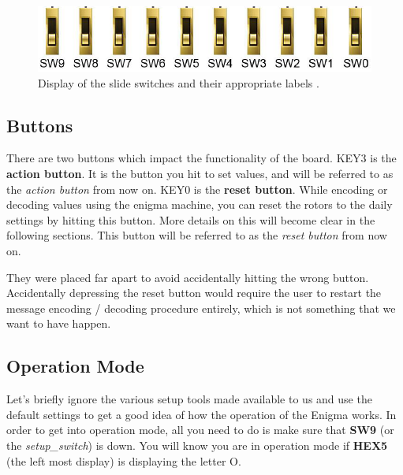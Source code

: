 \documentclass{article}
\begin{document}
\begin{figure}[ht!]
    \centering
    \includegraphics{slide_switch_shorthand.PNG}
    \caption{Display of the slide switches and their appropriate labels \cite{soc_manual}.}
    \label{fig:slide_switch_shorthand}
\end{figure}

\subsection{Buttons}
There are two buttons which impact the functionality of the board. KEY3 is the \textbf{action button}. It is the button you hit to set values, and will be referred to as the \textit{action button} from now on. KEY0 is the \textbf{reset button}. While encoding or decoding values using the enigma machine, you can reset the rotors to the daily settings by hitting this button. More details on this will become clear in the following sections. This button will be referred to as the \textit{reset button} from now on. 

They were placed far apart to avoid accidentally hitting the wrong button. Accidentally depressing the reset button would require the user to restart the message encoding / decoding procedure entirely, which is not something that we want to have happen. 

\subsection{Operation Mode}
Let's briefly ignore the various setup tools made available to us and use the default settings to get a good idea of how the operation of the Enigma works. In order to get into operation mode, all you need to do is make sure that \textbf{SW9} (or the \textit{setup\_switch}) is down. You will know you are in operation mode if \textbf{HEX5} (the left most display) is displaying the letter O. 
\end{document}

